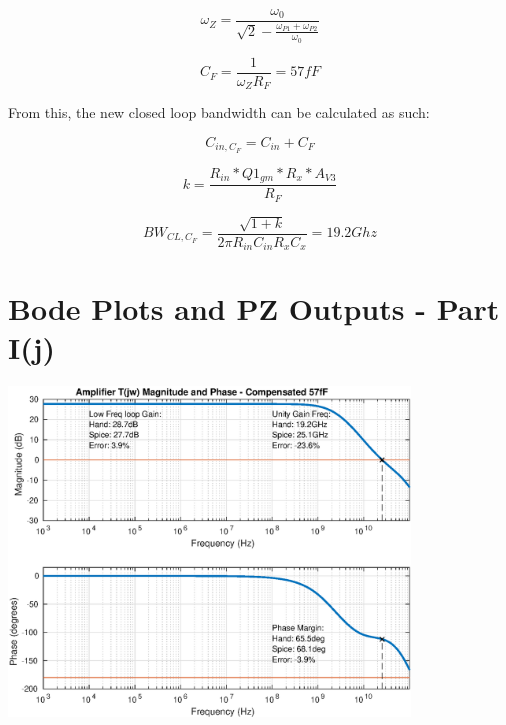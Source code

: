 \documentclass[12pt,a4paper]{article}
\begin{document}
\begin{equation}
  \omega_Z = \frac{\omega_{0}}{\sqrt{2} - \frac{\omega_{P1} + \omega_{P2}}{\omega_{0}}}
\end{equation}

\begin{equation}
  C_F = \frac{1}{\omega_Z R_F} = 57fF
\end{equation}

From this, the new closed loop bandwidth can be calculated as such:

\begin{equation}
  C_{in,C_F} = C_{in} + C_F
\end{equation}

\begin{equation}
  k = \frac{R_{in} * Q1_{gm} * R_x * A_{V3}}{R_F}
\end{equation}

\begin{equation}
  BW_{CL,C_F} = \frac{\sqrt{1 + k}}{2 \pi R_{in} C_{in} R_x C_x} = 19.2Ghz
\end{equation}

\pagebreak




\section{Bode Plots and PZ Outputs - Part I(j)}

{\centering
	\includegraphics[width=0.8\textwidth]{plots/part_j_t.eps}
\par}
\end{document}
